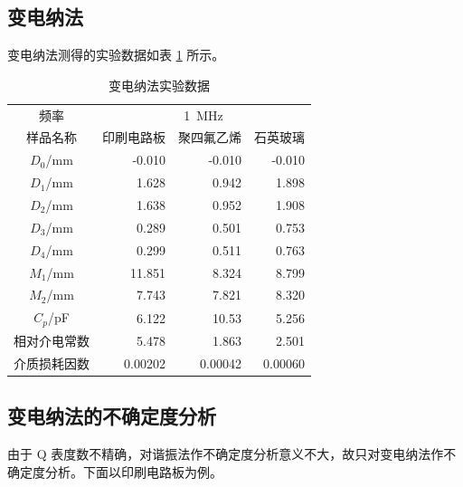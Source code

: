 \subsection{变电纳法}
变电纳法测得的实验数据如表 \ref{tab:A12.biandian} 所示。
\begin{table}[!ht]
    \caption{变电纳法实验数据} \label{tab:A12.biandian}
    \begin{tabular}{c*{3}{r}} \toprule
        频率 & \multicolumn{3}{c}{\SI{1}{\MHz}} \\
        样品名称 & 印刷电路板 & 聚四氟乙烯 & 石英玻璃 \\ \midrule
        $D_0$/\unit{\mm} & -0.010 & -0.010 & -0.010 \\
        $D_1$/\unit{\mm} & 1.628 & 0.942 & 1.898 \\
        $D_2$/\unit{\mm} & 1.638 & 0.952 & 1.908 \\
        $D_3$/\unit{\mm} & 0.289 & 0.501 & 0.753 \\
        $D_4$/\unit{\mm} & 0.299 & 0.511 & 0.763 \\
        $M_1$/\unit{\mm} & 11.851 & 8.324 & 8.799 \\
        $M_2$/\unit{\mm} & 7.743 & 7.821 & 8.320 \\
        $C_p$/\unit{\pF} & 6.122 & 10.53 & 5.256 \\
        相对介电常数 & 5.478 & 1.863 & 2.501 \\ 
        介质损耗因数 & 0.00202 & 0.00042 & 0.00060 \\ \bottomrule
    \end{tabular}
\end{table}
\subsection{变电纳法的不确定度分析}
由于 Q 表度数不精确，对谐振法作不确定度分析意义不大，故只对变电纳法作不确定度分析。下面以印刷电路板为例。
